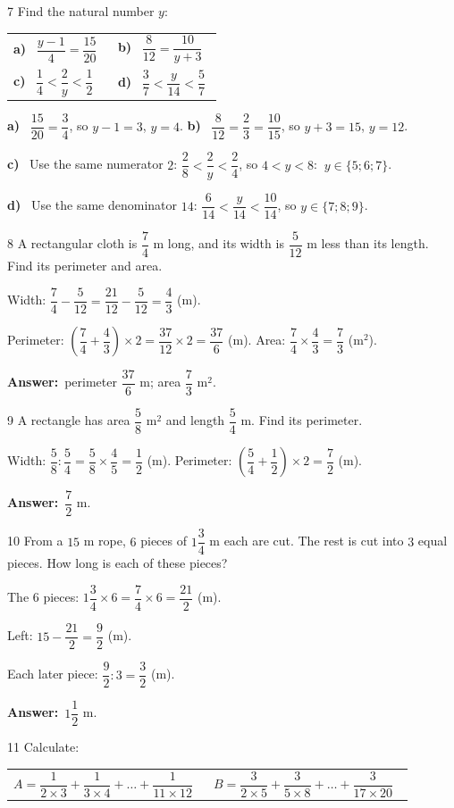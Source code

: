 \documentclass[11pt]{article}
\makeatletter
\newif\ifsol \solfalse
\renewcommand{\arraystretch}{1.35}
\providecommand{\AnsWord}{Đáp số}
\newcommand{\dapso}[1]{\par\textbf{\AnsWord:}\ #1}
\newcommand{\probsol}[1]{%
  \begin{lrbox}{\solmeasure}\begin{minipage}{\dimexpr\linewidth-24pt\relax}#1\end{minipage}\end{lrbox}%
  \ifsol
    \begin{solbox}#1\end{solbox}%
  \else
    \setlength{\solht}{\dimexpr\ht\solmeasure+\dp\solmeasure+0.85cm\relax}%
    \ifdim\solht<1.35cm\setlength{\solht}{1.35cm}\fi
    \begin{tcolorbox}[colback=white,colframe=Line,boxrule=0.8pt,arc=5pt,
      left=8pt,right=8pt,top=4pt,bottom=4pt,height=\solht]{\footnotesize\color{Slate}\itshape\WorkWord}\end{tcolorbox}%
  \fi}
\newcommand{\pa}[1]{\textbf{#1)}\ }
\newenvironment{cols2}{\par\vspace{3pt}\noindent\setlength{\tabcolsep}{0pt}\renewcommand{\arraystretch}{1.3}%
  \begin{tabular}{@{}>{\raggedright\arraybackslash\rule{0pt}{4.4ex}}p{0.48\linewidth}<{\rule[-2.3ex]{0pt}{0pt}}@{\hspace{0.03\linewidth}}>{\raggedright\arraybackslash\rule{0pt}{4.4ex}}p{0.48\linewidth}<{\rule[-2.3ex]{0pt}{0pt}}@{}}}%
  {\end{tabular}\par}
\newcommand{\gap}{\vspace{0.3cm}}
\def\WorkWord{Your work:}
\def\AnsWord{Answer}
\makeatother
\begin{document}
\gap
\begin{probbox}{7}{\relax}
Find the natural number $y$:
\begin{cols2}
\pa{a} $\dfrac{y-1}{4}=\dfrac{15}{20}$ & \pa{b} $\dfrac8{12}=\dfrac{10}{y+3}$\\
\pa{c} $\dfrac14<\dfrac2y<\dfrac12$ & \pa{d} $\dfrac37<\dfrac{y}{14}<\dfrac57$
\end{cols2}
\end{probbox}
\probsol{
\pa{a} $\dfrac{15}{20}=\dfrac34$, so $y-1=3$, $y=4$. \qquad \pa{b} $\dfrac8{12}=\dfrac23=\dfrac{10}{15}$, so $y+3=15$, $y=12$.\par
\pa{c} Use the same numerator $2$: $\dfrac28<\dfrac2y<\dfrac24$, so $4<y<8$: $\ y\in\{5;6;7\}$.\par
\pa{d} Use the same denominator $14$: $\dfrac6{14}<\dfrac y{14}<\dfrac{10}{14}$, so $y\in\{7;8;9\}$.
}
\gap
\begin{probbox}{8}{\relax}
A rectangular cloth is $\dfrac74$ m long, and its width is $\dfrac5{12}$ m less than its length. Find its perimeter and area.
\end{probbox}
\probsol{
Width: $\dfrac74-\dfrac5{12}=\dfrac{21}{12}-\dfrac5{12}=\dfrac43$ (m).\par
Perimeter: $\left(\dfrac74+\dfrac43\right)\times2=\dfrac{37}{12}\times2=\dfrac{37}6$ (m). \quad Area: $\dfrac74\times\dfrac43=\dfrac73$ (m$^2$).
\dapso{perimeter $\dfrac{37}6$ m; area $\dfrac73$ m$^2$.}}
\gap
\begin{probbox}{9}{\relax}
A rectangle has area $\dfrac58$ m$^2$ and length $\dfrac54$ m. Find its perimeter.
\end{probbox}
\probsol{
Width: $\dfrac58:\dfrac54=\dfrac58\times\dfrac45=\dfrac12$ (m). \quad Perimeter: $\left(\dfrac54+\dfrac12\right)\times2=\dfrac72$ (m).
\dapso{$\dfrac72$ m.}}
\gap
\begin{probbox}{10}{\relax}
From a $15$ m rope, $6$ pieces of $1\dfrac34$ m each are cut. The rest is cut into $3$ equal pieces. How long is each of these pieces?
\end{probbox}
\probsol{
The $6$ pieces: $1\dfrac34\times6=\dfrac74\times6=\dfrac{21}2$ (m).\par Left: $15-\dfrac{21}2=\dfrac92$ (m).\par
Each later piece: $\dfrac92:3=\dfrac32$ (m).
\dapso{$1\dfrac12$ m.}}
\gap
\begin{probbox}{11}{\relax}
Calculate:
\begin{cols2}
$A=\dfrac1{2\times3}+\dfrac1{3\times4}+\dots+\dfrac1{11\times12}$ & $B=\dfrac3{2\times5}+\dfrac3{5\times8}+\dots+\dfrac3{17\times20}$
\end{cols2}
\end{probbox}
\end{document}
